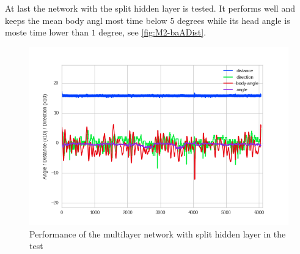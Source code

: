 \newline
At last the network with the split hidden layer is tested. It performs well and keeps the mean body angl most time below $5$ degrees while its head angle is moste time lower than $1$ degree, see \autoref{fig:M2-baADist}.
\begin{figure}[htpb]
  \centering
  \includegraphics[scale=0.80]{figures/plots/newPlots/m2-test_perf}%
  \caption{ Performance of the multilayer network with split hidden layer in the test}
  \label{fig:M2-baADist}
\end{figure}


